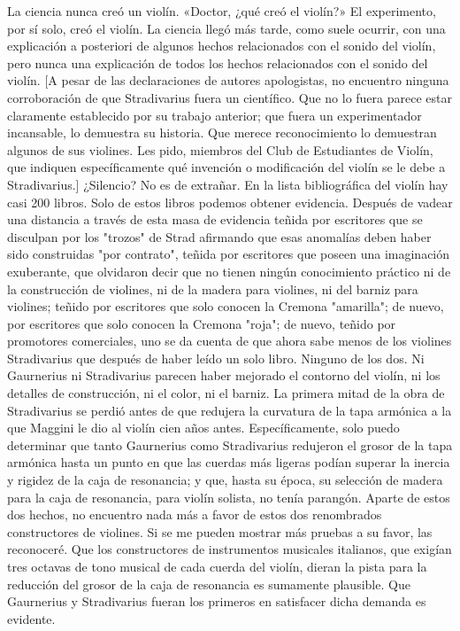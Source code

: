 La ciencia nunca creó un violín. «Doctor, ¿qué creó el violín?» El experimento, por sí solo, creó el violín.
La ciencia llegó más tarde, como suele ocurrir, con una explicación a posteriori de algunos hechos relacionados con el sonido del violín, pero nunca una explicación de todos los hechos relacionados con el sonido del violín.
[A pesar de las declaraciones de autores apologistas, no encuentro ninguna corroboración de que Stradivarius fuera un científico. Que no lo fuera parece estar claramente establecido por su trabajo anterior; que fuera un experimentador incansable, lo demuestra su historia. Que merece reconocimiento lo demuestran algunos de sus violines. Les pido, miembros del Club de Estudiantes de Violín, que indiquen específicamente qué invención o modificación del violín se le debe a Stradivarius.]
¿Silencio? No es de extrañar.
En la lista bibliográfica del violín hay casi 200 libros. Solo de estos libros podemos obtener evidencia. Después de vadear una distancia a través de esta masa de evidencia teñida por escritores que se disculpan por los "trozos" de Strad afirmando que esas anomalías deben haber sido construidas "por contrato", teñida por escritores que poseen una imaginación exuberante, \label{libros} que olvidaron decir que no tienen ningún conocimiento práctico ni de la construcción de violines, ni de la madera para violines, ni del barniz para violines; teñido por escritores que solo conocen la Cremona "amarilla"; de nuevo, por escritores que solo conocen la Cremona "roja"; de nuevo, teñido por promotores comerciales, uno se da cuenta de que ahora sabe menos de los violines Stradivarius que después de haber leído un solo libro.
Ninguno de los dos. Ni Gaurnerius ni Stradivarius parecen haber mejorado el contorno del violín, ni los detalles de construcción, ni el color, ni el barniz. La primera mitad de la obra de Stradivarius se perdió antes de que redujera la curvatura de la tapa armónica a la que Maggini le dio al violín cien años antes. Específicamente, solo puedo determinar que tanto Gaurnerius como Stradivarius redujeron el grosor de la tapa armónica hasta un punto en que las cuerdas más ligeras podían superar la inercia y rigidez de la caja de resonancia; y que, hasta su época, su selección de madera para la caja de resonancia, para violín solista, no tenía parangón. Aparte de estos dos hechos, no encuentro nada más a favor de estos dos renombrados constructores de violines. Si se me pueden mostrar más pruebas a su favor, las reconoceré. Que los constructores de instrumentos musicales italianos, que exigían tres octavas de tono musical de cada cuerda del violín, dieran la pista para la reducción del grosor de la caja de resonancia es sumamente plausible. Que Gaurnerius y Stradivarius fueran los primeros en satisfacer dicha demanda es evidente.
